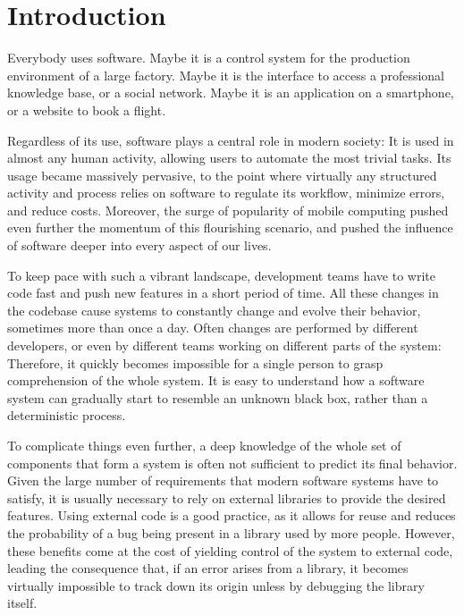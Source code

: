 
\chapter{Introduction}\label{ch:introduction}

Everybody uses software.
Maybe it is a control system for the production environment of a large factory.
Maybe it is the interface to access a professional knowledge base, or a social network.
Maybe it is an application on a smartphone, or a website to book a flight.

Regardless of its use, software plays a central role in modern society: It is used in almost any human activity, allowing users to automate the most trivial tasks.
Its usage became massively pervasive, to the point where virtually any structured activity and process relies on software to regulate its workflow, minimize errors, and reduce costs.
Moreover, the surge of popularity of mobile computing pushed even further the momentum of this flourishing scenario, and pushed the influence of software deeper into every aspect of our lives.

To keep pace with such a vibrant landscape, development teams have to write code fast and push new features in a short period of time.
All these changes in the codebase cause systems to constantly change and evolve their behavior, sometimes more than once a day.
Often changes are performed by different developers, or even by different teams working on different parts of the system: Therefore, it quickly becomes impossible for a single person to grasp comprehension of the whole system.
It is easy to understand how a software system can gradually start to resemble an unknown black box, rather than a deterministic process.

To complicate things even further, a deep knowledge of the whole set of components that form a system is often not sufficient to predict its final behavior.
Given the large number of requirements that modern software systems have to satisfy, it is usually necessary to rely on external libraries to provide the desired features.
Using external code is a good practice, as it allows for reuse and reduces the probability of a bug being present in a library used by more people.
However, these benefits come at the cost of yielding control of the system to external code, leading the consequence that, if an error arises from a library, it becomes virtually impossible to track down its origin unless by debugging the library itself.

